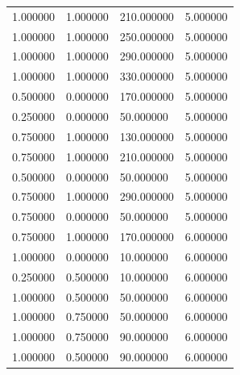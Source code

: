 \documentclass[12pt]{report}
\begin{document}
\begin{center}
\begin{table}[h!]
\begin{center}
\begin{tabular}{|llll|}
				1.000000                      & 1.000000                   & 210.000000                & 5.000000 \\
				1.000000                      & 1.000000                   & 250.000000                & 5.000000 \\
				1.000000                      & 1.000000                   & 290.000000                & 5.000000 \\
				1.000000                      & 1.000000                   & 330.000000                & 5.000000 \\
				0.500000                      & 0.000000                   & 170.000000                & 5.000000 \\
				0.250000                      & 0.000000                   & 50.000000                 & 5.000000 \\
				0.750000                      & 1.000000                   & 130.000000                & 5.000000 \\
				0.750000                      & 1.000000                   & 210.000000                & 5.000000 \\
				0.500000                      & 0.000000                   & 50.000000                 & 5.000000 \\
				0.750000                      & 1.000000                   & 290.000000                & 5.000000 \\
				0.750000                      & 0.000000                   & 50.000000                 & 5.000000 \\
				0.750000                      & 1.000000                   & 170.000000                & 6.000000 \\
				1.000000                      & 0.000000                   & 10.000000                 & 6.000000 \\
				0.250000                      & 0.500000                   & 10.000000                 & 6.000000 \\
				1.000000                      & 0.500000                   & 50.000000                 & 6.000000 \\
				1.000000                      & 0.750000                   & 50.000000                 & 6.000000 \\
				1.000000                      & 0.750000                   & 90.000000                 & 6.000000 \\
				1.000000                      & 0.500000                   & 90.000000                 & 6.000000 \\

\end{tabular}
\end{center}
\end{table}
\end{center}
\end{document}
